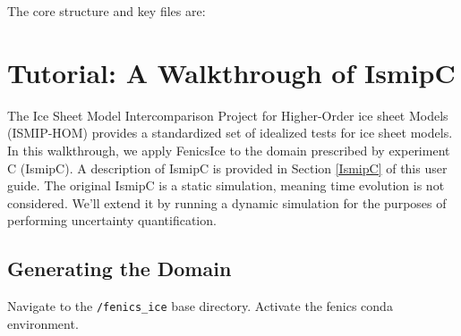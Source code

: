 \documentclass[11pt, reqno, nocenter]{article}
\begin{document}
The core structure and key files are: \\



\section{Tutorial: A Walkthrough of IsmipC}

The Ice Sheet Model Intercomparison Project for Higher-Order ice sheet Models (ISMIP-HOM) provides a standardized set of idealized tests for ice sheet models. In this walkthrough, we apply FenicsIce to the domain prescribed by experiment C (IsmipC). A description of IsmipC is provided in Section \ref{IsmipC} of this user guide. The original IsmipC is a static simulation, meaning time evolution is not considered. We'll extend it by running a dynamic simulation for the purposes of performing uncertainty quantification.


\subsection{Generating the Domain}

Navigate to the {\tt /fenics\_ice} base directory. Activate the fenics conda environment.
\end{document}
